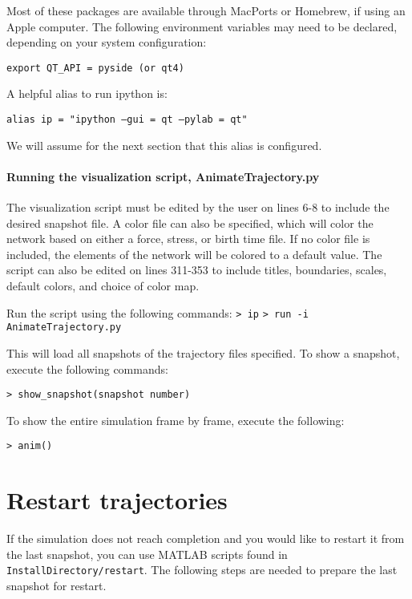 \documentclass[11pt, oneside]{article}   	%
\begin{document}
\noindent Most of these packages are available through MacPorts or Homebrew, if using an Apple computer. The following environment variables
may need to be declared, depending on your system configuration:\newline

\texttt{export QT\_API = pyside (or qt4)}\newline

\noindent A helpful alias to run ipython is:\newline

\texttt{alias ip = "ipython --gui = qt --pylab = qt"}\newline

\noindent We will assume for the next section that this alias is configured.

\paragraph{Running the visualization script, AnimateTrajectory.py}

The visualization script must be edited by the user on lines 6-8 to include the desired snapshot file. A color file can also be specified, which will color the network based on either a force, stress, or birth time file. If no color file is included, the elements of the network will be colored to a default value. The script can also be edited on lines 311-353 to include titles, boundaries, scales, default colors, and choice of color map. \newline

\noindent Run the script using the following commands:\newline\newline
\indent\texttt{> ip}\newline
\indent\texttt{> run -i AnimateTrajectory.py}\newline

\noindent This will load all snapshots of the trajectory files specified. To show a snapshot, execute the following commands:\newline

\texttt{> show\_snapshot(snapshot number)}\newline

\noindent To show the entire simulation frame by frame, execute the following:\newline

\texttt{> anim()}

\section{Restart trajectories}
If the simulation does not reach completion and you would like to restart it from the last snapshot, you can use MATLAB scripts found in \texttt{InstallDirectory/restart}. The following steps are needed to prepare the last snapshot for restart.
\end{document}
